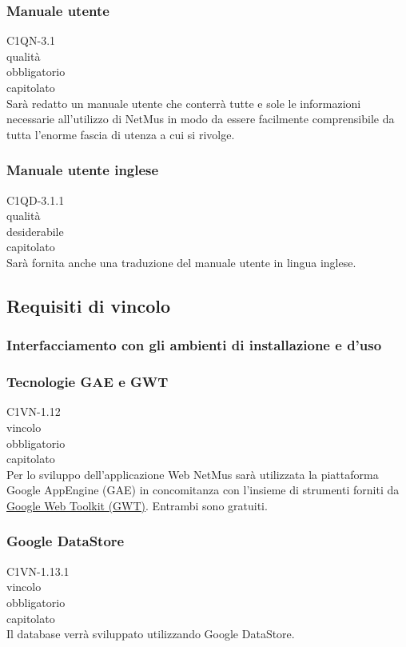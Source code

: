 \subsubsection*{Manuale utente}
 C1QN-3.1 \\
 qualit\`a \\
 obbligatorio \\
 capitolato \\
Sar\`a redatto un manuale utente che conterr\`a tutte e sole le informazioni
necessarie all'utilizzo di NetMus in modo da essere facilmente comprensibile da
tutta l'enorme fascia di utenza a cui si rivolge.

\subsubsection*{Manuale utente inglese}
 C1QD-3.1.1 \\
 qualit\`a \\
 desiderabile \\
 capitolato \\
Sar\`a fornita anche una traduzione del manuale utente in lingua inglese.


\subsection{Requisiti di vincolo}

\subsubsection{Interfacciamento con gli ambienti di installazione e d'uso }

\subsubsection*{Tecnologie GAE e GWT}
 C1VN-1.12 \\
 vincolo \\
 obbligatorio \\
 capitolato \\
Per lo sviluppo dell'applicazione Web NetMus sar\`a utilizzata la piattaforma
Google AppEngine (GAE) in concomitanza con l'insieme di strumenti forniti da
\underline{Google Web Toolkit (GWT)}. Entrambi sono gratuiti.

\subsubsection*{Google DataStore}
 C1VN-1.13.1 \\
 vincolo \\
 obbligatorio \\
 capitolato \\
Il database verr\`a sviluppato utilizzando Google DataStore.

